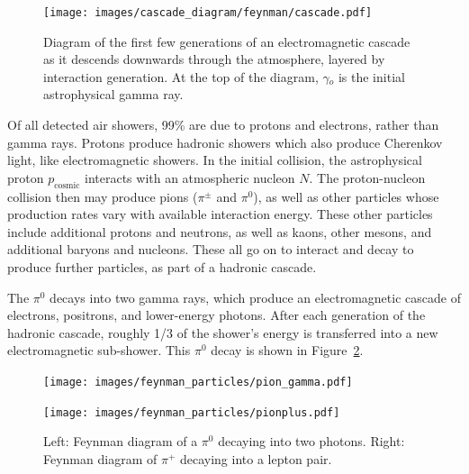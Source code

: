   \begin{figure}[t]
    \centering
    \texttt{[image: images/cascade\_diagram/feynman/cascade.pdf]}
    \caption[Electromagnetic Cascade]{
      Diagram of the first few generations of an electromagnetic cascade as it descends downwards through the atmosphere, layered by interaction generation. %
      At the top of the diagram, $\gamma{}_o$ is the initial astrophysical gamma ray.
      \CaptionBlankLine
    }
    \label{fig:emcascade}
  \end{figure}

  Of all detected air showers, \nicetilde{}99\% are due to protons and electrons, rather than gamma rays.
  Protons produce hadronic showers which also produce Cherenkov light, like electromagnetic showers.
  In the initial collision, the astrophysical proton $p_{\textrm{cosmic}}$ interacts with an atmospheric nucleon $N$.
  The proton-nucleon collision then may produce pions ($\pi^{\pm}$ and $\pi^{0}$), as well as other particles whose production rates vary with available interaction energy.
  These other particles include additional protons and neutrons, as well as kaons, other mesons, and additional baryons and nucleons.
  These all go on to interact and decay to produce further particles, as part of a hadronic cascade.

  
  The $\pi^0$ decays into two gamma rays, which produce an electromagnetic cascade of electrons, positrons, and lower-energy photons.
  After each generation of the hadronic cascade, roughly 1/3 of the shower's energy is transferred into a new electromagnetic sub-shower.
  This $\pi^{0}$ decay is shown in Figure~\ref{fig:feynman_pi}.
  
  \begin{figure}[tb]
    \centering
    \hfill
    \begin{minipage}{0.45\textwidth}\texttt{[image: images/feynman\_particles/pion\_gamma.pdf]}\end{minipage}\hfill
    \begin{minipage}{0.45\textwidth}\texttt{[image: images/feynman\_particles/pionplus.pdf]}  \end{minipage}\hfill
    \hfill\hfill
    \caption[Feynman Diagrams of Pions]{
      Left: Feynman diagram of a $\pi^{0}$ decaying into two photons.
      Right: Feynman diagram of $\pi^{+}$ decaying into a lepton pair.
      \CaptionBlankLine
    }
    \label{fig:feynman_pi}
  \end{figure}
      

